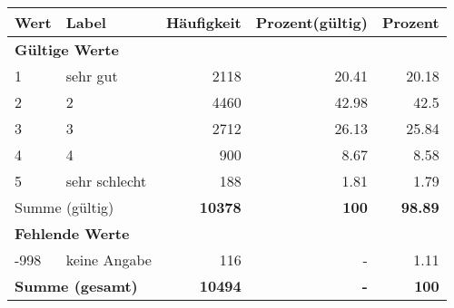      \begin{longtable}{lXrrr}
     \toprule
     \textbf{Wert} & \textbf{Label} & \textbf{Häufigkeit} & \textbf{Prozent(gültig)} & \textbf{Prozent} \\
     \endhead
     \midrule
     \multicolumn{5}{l}{\textbf{Gültige Werte}}\\

     1 &
     \multicolumn{1}{X}{ sehr gut   } &


       \num{2118} &
       \num[round-mode=places,round-precision=2]{20,41} &
         \num[round-mode=places,round-precision=2]{20,18} \\

     2 &
     \multicolumn{1}{X}{ 2   } &


       \num{4460} &
       \num[round-mode=places,round-precision=2]{42,98} &
         \num[round-mode=places,round-precision=2]{42,5} \\

     3 &
     \multicolumn{1}{X}{ 3   } &


       \num{2712} &
       \num[round-mode=places,round-precision=2]{26,13} &
         \num[round-mode=places,round-precision=2]{25,84} \\

     4 &
     \multicolumn{1}{X}{ 4   } &


       \num{900} &
       \num[round-mode=places,round-precision=2]{8,67} &
         \num[round-mode=places,round-precision=2]{8,58} \\

     5 &
     \multicolumn{1}{X}{ sehr schlecht   } &


       \num{188} &
       \num[round-mode=places,round-precision=2]{1,81} &
         \num[round-mode=places,round-precision=2]{1,79} \\
     \midrule
     \multicolumn{2}{l}{Summe (gültig)} &
       \textbf{\num{10378}} &
     \textbf{100} &
       \textbf{\num[round-mode=places,round-precision=2]{98,89}} \\
     \multicolumn{5}{l}{\textbf{Fehlende Werte}}\\
       -998 &
       keine Angabe &
         \num{116} &
        - &
         \num[round-mode=places,round-precision=2]{1,11} \\
     \midrule
     \multicolumn{2}{l}{\textbf{Summe (gesamt)}} &
          \textbf{\num{10494}} &
        \textbf{-} &
        \textbf{100} \\
     \bottomrule
     \end{longtable}
     
